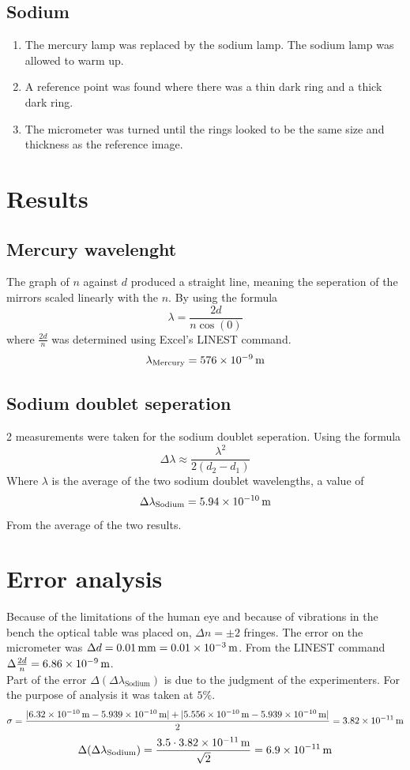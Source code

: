 \documentclass{article}
\begin{document}
        \subsection{Sodium}
            \begin{enumerate}
                \item The mercury lamp was replaced by the sodium lamp. The sodium lamp was allowed to warm up.
                \item A reference point was found where there was a thin dark ring and a thick dark ring. 
                \item The micrometer was turned until the rings looked to be the same size and thickness as the reference image.
            \end{enumerate}
    \section{Results}
        \subsection{Mercury wavelenght}
            The graph of $n$ against $d$ produced a straight line, meaning the seperation of the mirrors scaled linearly with the $n$. By using the formula 
                \[\lambda = \frac {2d}{n \cos(0)}\]
            where $\frac {2d} n$ was determined using Excel's LINEST command. 
                \[\lambda_{\text{Mercury}} = \qty{576E-9}{\m}\]
        \subsection{Sodium doublet seperation}
            2 measurements were taken for the sodium doublet seperation. Using the formula 
                \[\Delta \lambda \approx \frac {\lambda^2}{2(d_2 - d_1)}\]
            Where $\lambda$ is the average of the two sodium doublet wavelengths, a value of 
                \[\Delta \lambda_{\text{Sodium}} = \qty{5.94E-10}{\m}\]
            From the average of the two results.
    \section{Error analysis}
        Because of the limitations of the human eye and because of vibrations in the bench the optical table was placed on, $\Delta n = \pm 2$ fringes. The error on the micrometer was $\Delta d = \qty{0.01}{\mm} = \qty{0.01E-3}{\m}$. From the LINEST command $\Delta \frac {2d}{n} = \qty{6.86E-9}{\m}$. \\
        Part of the error $\Delta(\Delta \lambda_{\text{Sodium}})$ is due to the judgment of the experimenters. For the purpose of analysis it was taken at $5\%$. 
        \[\sigma = \frac {\abs{\qty{6.32E-10}{\m} - \qty{5.939E-10}{\m}} + \abs{\qty{5.556E-10}{\m} - \qty{5.939E-10}{\m}}} 2 = \qty{3.82E-11}{\m}\]
            \[\Delta(\Delta \lambda_{\text{Sodium}}) = \frac {3.5 \cdot \qty{3.82E-11}{\m}}{\sqrt 2} = \qty{6.9E-11}{\m}\]
\end{document}
